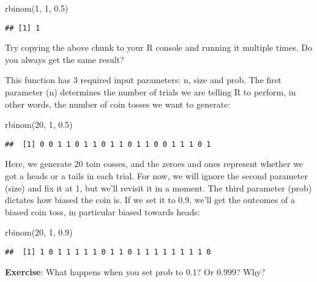 \documentclass[
]{book}
\newenvironment{Shaded}{\begin{snugshade}}{\end{snugshade}}
\newcommand{\DecValTok}[1]{\textcolor[rgb]{0.00,0.00,0.81}{#1}}
\newcommand{\FloatTok}[1]{\textcolor[rgb]{0.00,0.00,0.81}{#1}}
\newcommand{\FunctionTok}[1]{\textcolor[rgb]{0.00,0.00,0.00}{#1}}
\newcommand{\NormalTok}[1]{#1}
\begin{document}
\begin{Shaded}
\begin{Highlighting}[]
\FunctionTok{rbinom}\NormalTok{(}\DecValTok{1}\NormalTok{, }\DecValTok{1}\NormalTok{, }\FloatTok{0.5}\NormalTok{)}
\end{Highlighting}
\end{Shaded}

\begin{verbatim}
## [1] 1
\end{verbatim}

Try copying the above chunk to your R console and running it multiple times. Do you always get the same result?

This function has 3 required input parameters: n, size and prob. The first parameter (n) determines the number of trials we are telling R to perform, in other words, the number of coin tosses we want to generate:

\begin{Shaded}
\begin{Highlighting}[]
\FunctionTok{rbinom}\NormalTok{(}\DecValTok{20}\NormalTok{, }\DecValTok{1}\NormalTok{, }\FloatTok{0.5}\NormalTok{)}
\end{Highlighting}
\end{Shaded}

\begin{verbatim}
##  [1] 0 0 1 1 0 1 1 0 1 1 0 1 1 0 0 1 1 1 0 1
\end{verbatim}

Here, we generate 20 toin cosses, and the zeroes and ones represent whether we got a heads or a tails in each trial. For now, we will ignore the second parameter (size) and fix it at 1, but we'll revisit it in a moment. The third parameter (prob) dictates how biased the coin is. If we set it to 0.9, we'll get the outcomes of a biased coin toss, in particular biased towards heads:

\begin{Shaded}
\begin{Highlighting}[]
\FunctionTok{rbinom}\NormalTok{(}\DecValTok{20}\NormalTok{, }\DecValTok{1}\NormalTok{, }\FloatTok{0.9}\NormalTok{)}
\end{Highlighting}
\end{Shaded}

\begin{verbatim}
##  [1] 1 0 1 1 1 1 1 0 1 1 0 1 1 1 1 1 1 1 1 0
\end{verbatim}

\textbf{Exercise}: What happens when you set prob to 0.1? Or 0.999? Why?
\end{document}
